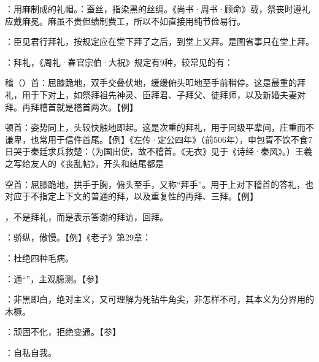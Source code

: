 {
\item {}：用麻制成的礼帽。：蚕丝，指染黑的丝绸。《尚书·周书·顾命》载，祭丧时遵礼应戴麻冕。麻虽不贵但绩制费工，所以不如直接用纯节俭易行。
\item {}：臣见君行拜礼，按规定应在堂下拜了之后，到堂上又拜。是图省事只在堂上拜。%

：拜礼，《周礼·春官宗伯·大祝》规定有9种，较常见的有：
\begin{lyitemize}
\item 稽（）首：屈膝跪地，双手交叠伏地，缓缓俯头叩地至手前稍停。这是最重的拜礼，用于下对上，如祭拜祖先神灵、臣拜君、子拜父、徒拜师，以及新婚夫妻对拜。再拜稽首就是稽首两次。【例】
\item 顿首：姿势同上，头较快触地即起。这是次重的拜礼，用于同级平辈间，庄重而不谦卑，也常用于信件首尾。【例】《左传·定公四年》（前506年），申包胥不饮不食7日哭于秦廷求兵救楚：（为国出使，故不稽首。《无衣》见于《诗经·秦风》。）王羲之写给友人的《丧乱帖》，开头和结尾都是  %
\item {}空首：屈膝跪地，拱手于胸，俯头至手，又称“拜手”。用于上对下稽首的答礼，也对应于不指定上下文的普通的拜，以及重复性的再拜、三拜。【例】  
\end{lyitemize}
 ，不是拜礼，而是表示答谢的拜访，回拜。
\item {}：骄纵，傲慢。【例】《老子》第29章：
}
{}


{
\item {}：杜绝四种毛病。
\item {}：通“”，主观臆测。【参】
\item {}：非黑即白，绝对主义，又可理解为死钻牛角尖，非怎样不可，其本义为分界用的木橛。%
\item {}：顽固不化，拒绝变通。【参】
\item {}：自私自我。
}
{}


